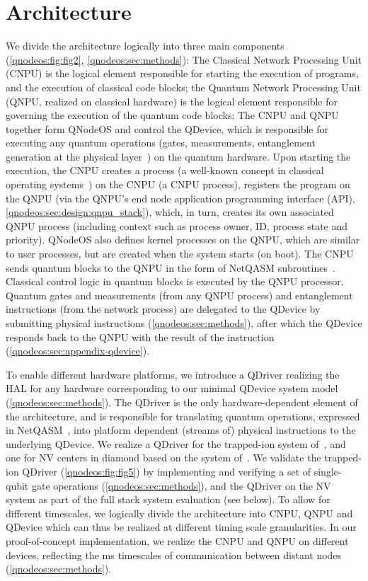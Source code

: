 \section{Architecture}
\label{qnodeos:sec:architecture}
We divide the architecture logically into three main components (\cref{qnodeos:fig:fig2}, \cref{qnodeos:sec:methods}):
The Classical Network Processing Unit (CNPU) is the logical element responsible for starting the execution of programs, and the execution of classical code blocks;
the Quantum Network Processing Unit (QNPU, realized on classical hardware) is the logical element responsible for governing the execution of the quantum code blocks;
The CNPU and QNPU together form QNodeOS and control the QDevice, which is responsible for executing any quantum operations (gates, measurements, entanglement generation at the physical layer~\cite{dahlberg_2019_egp}) on the quantum hardware.
Upon starting the execution, the CNPU creates a process (a well-known concept in classical operating systems~\cite{dennis_programming_1966-1,tanenbaum_operating_2005}) on the CNPU (a CNPU process), registers the program on the QNPU (via the QNPU's end node application programming interface (API), \cref{qnodeos:sec:design:qnpu_stack}), which, in turn, creates its own associated QNPU process (including context such as process owner, ID, process state and priority).
QNodeOS also defines kernel processes on the QNPU, which are similar to user processes, but are created when the system starts (on boot).
The CNPU sends quantum blocks to the QNPU in the form of NetQASM subroutines~\cite{dahlberg_2022_netqasm}.
Classical control logic in quantum blocks is executed by the QNPU processor.
Quantum gates and measurements (from any QNPU process) and entanglement instructions (from the network process) are delegated to the QDevice by submitting physical instructions (\cref{qnodeos:sec:methods}), after which the QDevice responds back to the QNPU with the result of the instruction (\cref{qnodeos:sec:appendix-qdevice}). 

To enable different hardware platforms, we introduce a QDriver realizing the HAL for any hardware corresponding to our minimal QDevice system model (\cref{qnodeos:sec:methods}).
The QDriver is the only hardware-dependent element of the architecture, and is responsible for translating quantum operations, expressed in NetQASM~\cite{dahlberg_2022_netqasm}, into platform dependent (streams of) physical instructions to the underlying QDevice.
We realize a QDriver for the trapped-ion system of~\cite{teller2023integrating,teller2021heating}, and one for NV centers in diamond based on the system of~\cite{hermans2022qubit,pompili_2021_multinode,pompili_2022_experimental}.
We validate the trapped-ion QDriver (\cref{qnodeos:fig:fig5}) by implementing and verifying a set of single-qubit gate operations (\cref{qnodeos:sec:methods}), and the QDriver on the NV system as part of the full stack system evaluation (see below). 
To allow for different timescales, we logically divide the architecture into CNPU, QNPU and QDevice which can thus be realized at different timing scale granularities.
In our proof-of-concept implementation, we realize the CNPU and QNPU on different devices, reflecting the ms timescales of communication between distant nodes (\cref{qnodeos:sec:methods}).


